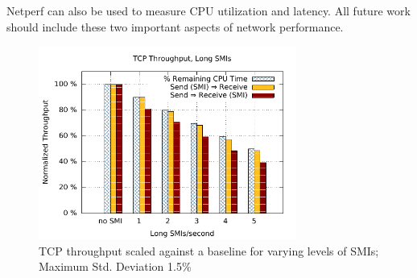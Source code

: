 \documentclass{IEEEtran}
\begin{document}
   Netperf can also be used to measure CPU utilization and latency. All future work
   should include these two important aspects of network performance.

   \begin{figure}[H]
   \includegraphics[keepaspectratio=true,width=240pt]{jm_graph1.pdf}
   \caption{TCP throughput scaled against a baseline for varying levels of SMIs;
       Maximum Std. Deviation 1.5\%}
       \label{jm_graph1}
       \end{figure}
       \newcommand{\specialcell}[2][c]{%
             \begin{tabular}[#1]{@{}c@{}}#2\end{tabular}}
\end{document}
